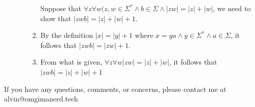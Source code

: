 \documentclass{math}
\begin{document}
\begin{enumerate}
\begin{enumerate}
\begin{enumerate}
      Suppose that \( \forall{z}\forall{w}(z,w\in\Sigma^*\wedge
      b\in\Sigma\wedge|zw| = |z|+|w| \), we need to show that \( |zwb| =
      |z|+|w|+1 \).
      \item By the definition \( |x| = |y|+1 \text{ where } x=ya\wedge y\in
      \Sigma^*\wedge a\in\Sigma\), it follows that \( |zwb| = |zw| + 1 \).
      \item From what is given, \( \forall{z}\forall{w}|zw| = |z|+|w| \), it
      follows that \( |zwb| = |z|+|w|+1 \)
    \end{enumerate}
  \end{enumerate}
\end{enumerate}

\begin{center}
  If you have any questions, comments, or concerns, please contact me at
  alvin@omgimanerd.tech
\end{center}
\end{document}

